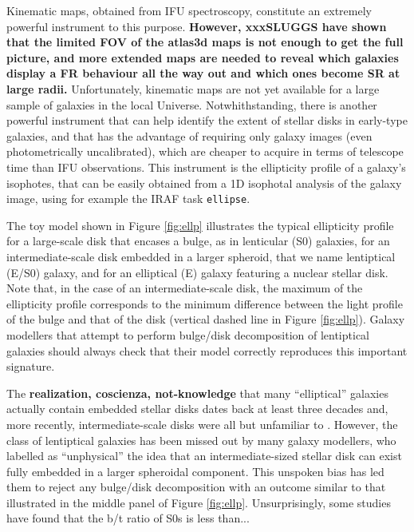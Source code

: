 \documentclass[12pt,preprint]{nature}
\begin{document}
Kinematic maps, obtained from IFU spectroscopy, constitute an extremely powerful instrument to this purpose. 
{\bf However, xxxSLUGGS have shown that the limited FOV of the atlas3d maps is not enough to get the full picture,
and more extended maps are needed to reveal which galaxies display a FR behaviour all the way out 
and which ones become SR at large radii.}
Unfortunately, kinematic maps are not yet available for a large sample of galaxies in the local Universe. 
Notwhithstanding, there is another powerful instrument that can help identify the extent of 
stellar disks in early-type galaxies, 
and that has the advantage of requiring only galaxy images (even photometrically uncalibrated), 
which are cheaper to acquire in terms of telescope time than IFU observations. 
This instrument is the ellipticity profile of a galaxy's isophotes, 
that can be easily obtained from a 1D isophotal analysis of the galaxy image, 
using for example the IRAF task {\tt ellipse}. 

The toy model shown in Figure \ref{fig:ellp} illustrates the typical ellipticity profile 
for a large-scale disk that encases a bulge, as in lenticular (S0) galaxies, 
for an intermediate-scale disk embedded in a larger spheroid, that we name lentiptical (E/S0) galaxy, 
and for an elliptical (E) galaxy featuring a nuclear stellar disk. 
Note that, in the case of an intermediate-scale disk, 
the maximum of the ellipticity profile corresponds to the minimum difference between the 
light profile of the bulge and that of the disk (vertical dashed line in Figure \ref{fig:ellp}). 
Galaxy modellers that attempt to perform bulge/disk decomposition of lentiptical galaxies 
should always check that their model correctly reproduces this important signature.

The {\bf realization, coscienza, not-knowledge} that many ``elliptical'' galaxies 
actually contain embedded stellar disks 
dates back at least three decades 
\citep{capaccioli1987,carter1987,rixwhite1990,bender1990,scorzabender1990,nieto1991,rixwhite1992,scorzabender1995,
donofrio1995,graham1998fornax,scorza1998,scorzavandenbosch1998,bendersaglia1999} and, 
more recently, intermediate-scale disks were all but unfamiliar to \cite{krajnovic2013}. 
However, the class of lentiptical galaxies has been missed out by many galaxy modellers, 
who labelled as ``unphysical'' the idea that an intermediate-sized stellar disk 
can exist fully embedded in a larger spheroidal component. 
This unspoken bias has led them to reject any bulge/disk decomposition with an outcome 
similar to that illustrated in the middle panel of Figure \ref{fig:ellp}. 
Unsurprisingly, some studies have found that the b/t ratio of S0s is less than...
\end{document}
